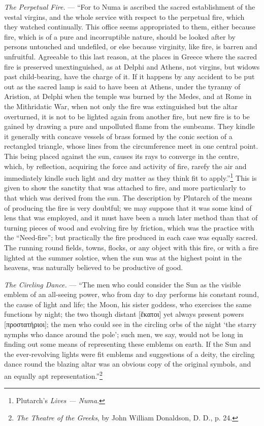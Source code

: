 \documentclass[a4paper, 11pt, oneside, polutonikogreek, english]{article}
\begin{document}
\emph{The Perpetual Fire.} --- ``For to Numa is ascribed the sacred establishment of the vestal virgins, and the whole service with respect to the perpetual fire, which they watched continually. This office seems appropriated to them, either because fire, which is of a pure and incorruptible nature, should be looked after by persons untouched and undefiled, or else because virginity, like fire, is barren and unfruitful. Agreeable to this last reason, at the places in Greece where the sacred fire is preserved unextinguished, as at Delphi and Athens, not virgins, but widows past child-bearing, have the charge of it. If it happens by any accident to be put out as the sacred lamp is said to have been at Athens, under the tyranny of Aristion, at Delphi when the temple was burned by the Medes, and at Rome in the Mithridatic War, when not only the fire was extinguished but the altar overturned, it is not to be lighted again from another fire, but new fire is to be gained by drawing a pure and unpolluted flame from the sunbeams. They kindle it generally with concave vessels of brass formed by the conic section of a rectangled triangle, whose lines from the circumference meet in one central point. This being placed against the sun, causes its rays to converge in the centre, which, by reflection, acquiring the force and activity of fire, rarefy the air and immediately kindle such light and dry matter as they think fit to apply.''\footnote{Plutarch's \emph{Lives --- Numa}.} This is given to show the sanctity that was attached to fire, and more particularly to that which was derived from the sun. The description by Plutarch of the means of producing the fire is very doubtful; we may suppose that it was some kind of lens that was employed, and it must have been a much later method than that of turning pieces of wood and evolving fire by friction, which was the practice with the ``Need-fire''; but practically the fire produced in each case was equally sacred. The running round fields, towns, flocks, or any object with this fire, or with a fire lighted at the summer solstice, when the sun was at the highest point in the heavens, was naturally believed to be productive of good.

\emph{The Circling Dance.} --- ``The men who could consider the Sun as the visible emblem of an all-seeing power, who from day to day performs his constant round, the cause of light and life; the Moon, his sister goddess, who exercises the same functions by night; the two though distant [ἔκατοι] yet always present powers [προστατήριοι]; the men who could see in the circling orbs of the night `the starry nymphs who dance around the pole'; such men, we say, would not be long in finding out some means of representing these emblems on earth. If the Sun and the ever-revolving lights were fit emblems and suggestions of a deity, the circling dance round the blazing altar was an obvious copy of the original symbols, and an equally apt representation.''\footnote{\emph{The Theatre of the Greeks}, by John William Donaldson, D. D., p. 24.} 
\end{document}
